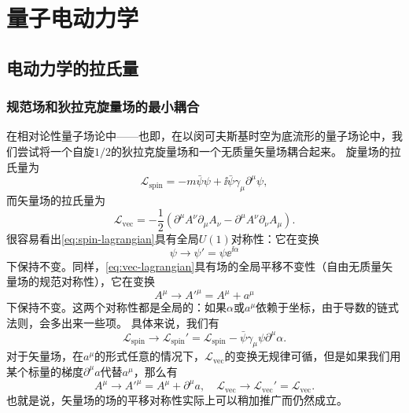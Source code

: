 \chapter{量子电动力学}

\section{电动力学的拉氏量}

\subsection{规范场和狄拉克旋量场的最小耦合}

在相对论性量子场论中——也即，在以闵可夫斯基时空为底流形的量子场论中，我们尝试将一个自旋$1/2$的狄拉克旋量场和一个无质量矢量场耦合起来。
旋量场的拉氏量为
\begin{equation}
    \mathcal{L}_\text{spin} = - m \bar{\psi} \psi + \ii \bar{\psi} \gamma_\mu \partial^\mu \psi,
    \label{eq:spin-lagrangian}
\end{equation}
而矢量场的拉氏量为
\begin{equation}
    \mathcal{L}_\text{vec} = - \frac{1}{2} (\partial^\mu A^\nu \partial_\mu A_\nu - \partial^\mu A^\nu \partial_\nu A_\mu).
    \label{eq:vec-lagrangian}
\end{equation}
很容易看出\eqref{eq:spin-lagrangian}具有全局$U(1)$对称性：它在变换
\[
    \psi \longrightarrow \psi' = \psi \ee^{\ii \alpha}
\]
下保持不变。同样，\eqref{eq:vec-lagrangian}具有场的全局平移不变性（自由无质量矢量场的规范对称性），它在变换
\[
    A^\mu \longrightarrow A'^\mu = A^\mu + a^\mu
\]
下保持不变。这两个对称性都是全局的：如果$\alpha$或$a^\mu$依赖于坐标，由于导数的链式法则，会多出来一些项。
具体来说，我们有
\begin{equation}
    \mathcal{L}_\text{spin} \longrightarrow \mathcal{L}_\text{spin}' = \mathcal{L}_\text{spin} - \bar{\psi} \gamma_\mu \psi \partial^\mu \alpha.
    \label{eq:psi-change}
\end{equation}
对于矢量场，在$a^\mu$的形式任意的情况下，$\mathcal{L}_\text{vec}$的变换无规律可循，但是如果我们用某个标量的梯度$\partial^\mu a$代替$a^\mu$，那么有
\[
    A^\mu \longrightarrow A'^\mu = A^\mu + \partial^\mu a, \quad
    \mathcal{L}_\text{vec} \longrightarrow \mathcal{L}_\text{vec}' = \mathcal{L}_\text{vec}.
\]
也就是说，矢量场的场的平移对称性实际上可以稍加推广而仍然成立。

